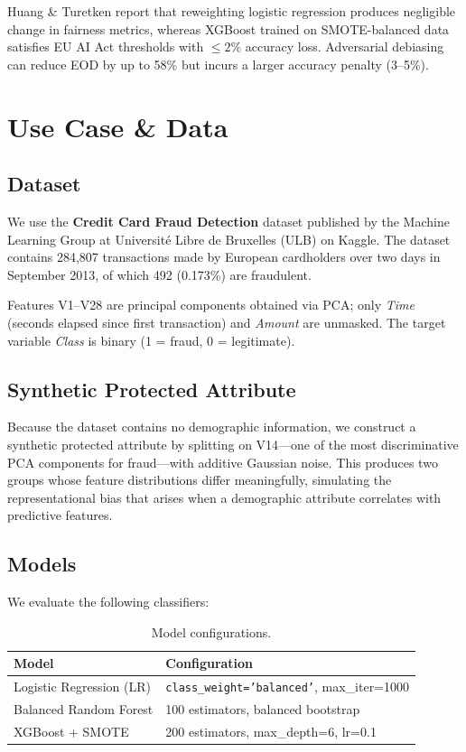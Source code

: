 \documentclass[conference]{IEEEtran}
\begin{document}
Huang \& Turetken \cite{huang2025} report that reweighting logistic regression produces negligible change in fairness metrics, whereas XGBoost trained on SMOTE-balanced data satisfies EU AI Act thresholds with $\leq 2\%$ accuracy loss. Adversarial debiasing can reduce EOD by up to 58\% but incurs a larger accuracy penalty (3--5\%).

\section{Use Case \& Data}
\label{sec:methodology}

\subsection{Dataset}

We use the \textbf{Credit Card Fraud Detection} dataset published by the Machine Learning Group at Universit\'e Libre de Bruxelles (ULB) on Kaggle. The dataset contains 284,807 transactions made by European cardholders over two days in September 2013, of which 492 (0.173\%) are fraudulent.

Features V1--V28 are principal components obtained via PCA; only \textit{Time} (seconds elapsed since first transaction) and \textit{Amount} are unmasked. The target variable \textit{Class} is binary (1 = fraud, 0 = legitimate).

\subsection{Synthetic Protected Attribute}

Because the dataset contains no demographic information, we construct a synthetic protected attribute by splitting on V14---one of the most discriminative PCA components for fraud---with additive Gaussian noise. This produces two groups whose feature distributions differ meaningfully, simulating the representational bias that arises when a demographic attribute correlates with predictive features.

\subsection{Models}

We evaluate the following classifiers:

\begin{table}[htbp]
\centering
\caption{Model configurations.}
\label{tab:models}
\footnotesize
\begin{tabular}{@{}p{3.5cm} p{4.5cm}@{}}
\toprule
Model & Configuration \\
\midrule
Logistic Regression (LR) & \texttt{class\_weight='balanced'}, max\_iter=1000 \\
Balanced Random Forest & 100 estimators, balanced bootstrap \\
XGBoost + SMOTE & 200 estimators, max\_depth=6, lr=0.1 \\
\bottomrule
\end{tabular}
\end{table}
\end{document}

